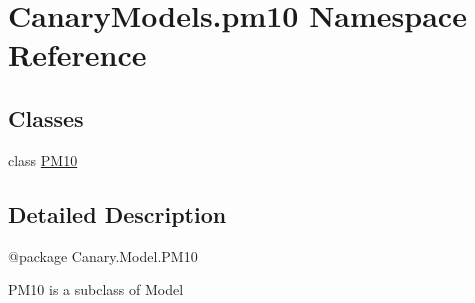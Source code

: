 \hypertarget{namespace_canary_models_1_1pm10}{\section{Canary\-Models.\-pm10 Namespace Reference}
\label{namespace_canary_models_1_1pm10}
}
\subsection*{Classes}
\begin{DoxyCompactItemize}
\item 
class \hyperlink{class_canary_models_1_1pm10_1_1_p_m10}{P\-M10}
\end{DoxyCompactItemize}


\subsection{Detailed Description}
\begin{DoxyVerb}@package Canary.Model.PM10

PM10 is a subclass of Model
\end{DoxyVerb}
 